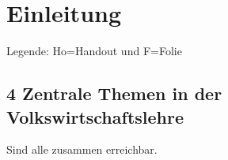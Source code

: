\section{Einleitung}
Legende: Ho=Handout und F=Folie
\subsection{4 Zentrale Themen in der Volkswirtschaftslehre }
Sind alle zusammen erreichbar.
